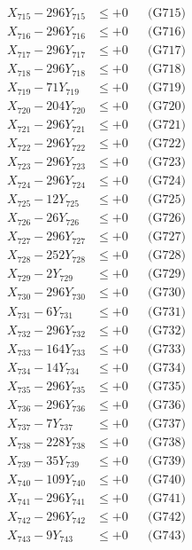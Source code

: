 \documentclass[a4paper,10pt]{article}
\begin{document}
{\begin{align}
X_{715} - 296Y_{715} &\leq +0 && \text{(G715)} \\
X_{716} - 296Y_{716} &\leq +0 && \text{(G716)} \\
X_{717} - 296Y_{717} &\leq +0 && \text{(G717)} \\
X_{718} - 296Y_{718} &\leq +0 && \text{(G718)} \\
X_{719} - 71Y_{719} &\leq +0 && \text{(G719)} \\
X_{720} - 204Y_{720} &\leq +0 && \text{(G720)} \\
\allowbreak
X_{721} - 296Y_{721} &\leq +0 && \text{(G721)} \\
X_{722} - 296Y_{722} &\leq +0 && \text{(G722)} \\
X_{723} - 296Y_{723} &\leq +0 && \text{(G723)} \\
X_{724} - 296Y_{724} &\leq +0 && \text{(G724)} \\
X_{725} - 12Y_{725} &\leq +0 && \text{(G725)} \\
X_{726} - 26Y_{726} &\leq +0 && \text{(G726)} \\
X_{727} - 296Y_{727} &\leq +0 && \text{(G727)} \\
X_{728} - 252Y_{728} &\leq +0 && \text{(G728)} \\
X_{729} - 2Y_{729} &\leq +0 && \text{(G729)} \\
X_{730} - 296Y_{730} &\leq +0 && \text{(G730)} \\
\allowbreak
X_{731} - 6Y_{731} &\leq +0 && \text{(G731)} \\
X_{732} - 296Y_{732} &\leq +0 && \text{(G732)} \\
X_{733} - 164Y_{733} &\leq +0 && \text{(G733)} \\
X_{734} - 14Y_{734} &\leq +0 && \text{(G734)} \\
X_{735} - 296Y_{735} &\leq +0 && \text{(G735)} \\
X_{736} - 296Y_{736} &\leq +0 && \text{(G736)} \\
X_{737} - 7Y_{737} &\leq +0 && \text{(G737)} \\
X_{738} - 228Y_{738} &\leq +0 && \text{(G738)} \\
X_{739} - 35Y_{739} &\leq +0 && \text{(G739)} \\
X_{740} - 109Y_{740} &\leq +0 && \text{(G740)} \\
\allowbreak
X_{741} - 296Y_{741} &\leq +0 && \text{(G741)} \\
X_{742} - 296Y_{742} &\leq +0 && \text{(G742)} \\
X_{743} - 9Y_{743} &\leq +0 && \text{(G743)} \\

\end{align}}
\end{document}
